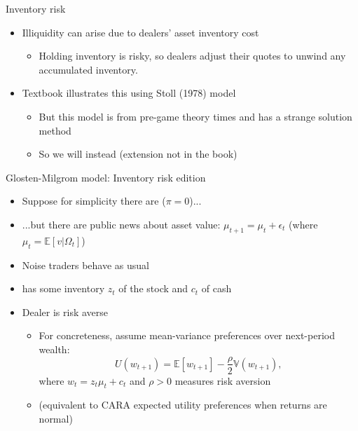 \documentclass[english,10pt
,aspectratio=169
]{beamer}
\begin{document}
\begin{frame}{Inventory risk}
	\begin{itemize}
		\item Illiquidity can arise due to dealers' asset \alert{inventory cost}
		\begin{itemize}
			\item Holding inventory is \alert{risky}, so dealers adjust their quotes to unwind any accumulated inventory.
		\end{itemize}
		\pause
		\item Textbook illustrates this using Stoll (1978) model
		\begin{itemize}
			\item But this model is from pre-game theory times and has a strange solution method
			\item So we will instead  (extension not in the book)
		\end{itemize}
	\end{itemize}
\end{frame}


\begin{frame}{Glosten-Milgrom model: Inventory risk edition}
	\begin{itemize}
		\item Suppose for simplicity there are  ($\pi=0$)...
		\item ...but there are public news about asset value: $\mu_{t+1} = \mu_t + \epsilon_t$  (where $\mu_t = \mathbb{E}[v|\Omega_t]$)
		\item Noise traders behave as usual
		\item {} has some \alert{inventory} $z_t$ of the stock and $c_t$ of cash
		\item Dealer is \alert{risk averse}
		\begin{itemize}
			\item For concreteness, assume mean-variance preferences over next-period wealth:
			\[
			U(w_{t+1})=\mathbb{E}[w_{t+1}] - \frac{\rho}{2} \mathbb{V}(w_{t+1}),
			\]
			where $w_t = z_t \mu_t + c_t$ and $\rho>0$ measures risk aversion
			\item (equivalent to CARA expected utility preferences when returns are normal)
		\end{itemize}
	\end{itemize}
\end{frame}
\end{document}
